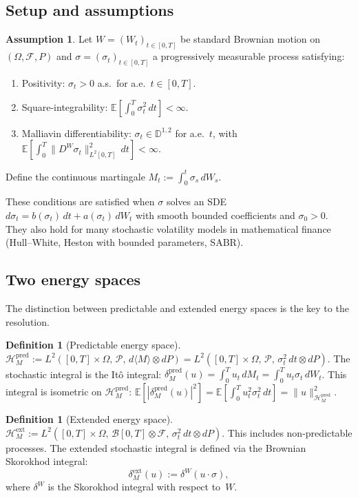 \documentclass[11pt,a4paper]{article}
\theoremstyle{plain}
\theoremstyle{definition}
\newtheorem{definition}[theorem]{Definition}
\newtheorem{assumption}[theorem]{Assumption}
\theoremstyle{remark}
\newcommand{\E}{\mathbb{E}}
\newcommand{\HM}{\mathcal{H}_M}
\begin{document}
\subsection{Setup and assumptions}

\begin{assumption}\label{ass:sv}
Let $W = (W_t)_{t \in [0,T]}$ be standard Brownian motion on $(\Omega, \mathcal{F}, P)$ and $\sigma = (\sigma_t)_{t \in [0,T]}$ a progressively measurable process satisfying:
\begin{enumerate}[label=(\roman*)]
\item \textup{Positivity:} $\sigma_t > 0$ a.s.\ for a.e.\ $t \in [0,T]$.
\item \textup{Square-integrability:} $\E[\int_0^T \sigma_t^2\,dt] < \infty$.
\item \textup{Malliavin differentiability:} $\sigma_t \in \mathbb{D}^{1,2}$ for a.e.~$t$, with $\E[\int_0^T \|D^W \sigma_t\|^2_{L^2[0,T]}\,dt] < \infty$.
\end{enumerate}
Define the continuous martingale $M_t := \int_0^t \sigma_s\,dW_s$.
\end{assumption}

These conditions are satisfied when $\sigma$ solves an SDE $d\sigma_t = b(\sigma_t)\,dt + a(\sigma_t)\,dW_t$ with smooth bounded coefficients and $\sigma_0 > 0$. They also hold for many stochastic volatility models in mathematical finance (Hull--White, Heston with bounded parameters, SABR).


\subsection{Two energy spaces}

The distinction between predictable and extended energy spaces is the key to the resolution.

\begin{definition}[Predictable energy space]\label{def:HM_pred}
$\HM^{\mathrm{pred}} := L^2([0,T] \times \Omega,\, \mathcal{P},\, d\langle M\rangle \otimes dP) = L^2([0,T] \times \Omega,\, \mathcal{P},\, \sigma_t^2\,dt \otimes dP)$. The stochastic integral is the It\^o integral: $\delta_M^{\mathrm{pred}}(u) = \int_0^T u_t\,dM_t = \int_0^T u_t \sigma_t\,dW_t$. This integral is isometric on $\HM^{\mathrm{pred}}$: $\E[|\delta_M^{\mathrm{pred}}(u)|^2] = \E[\int_0^T u_t^2 \sigma_t^2\,dt] = \|u\|^2_{\HM^{\mathrm{pred}}}$.
\end{definition}

\begin{definition}[Extended energy space]\label{def:HM_ext}
$\HM^{\mathrm{ext}} := L^2([0,T] \times \Omega,\, \mathcal{B}[0,T] \otimes \mathcal{F},\, \sigma_t^2\,dt \otimes dP)$. This includes non-predictable processes. The extended stochastic integral is defined via the Brownian Skorokhod integral:
\[
\delta_M^{\mathrm{ext}}(u) := \delta^W(u \cdot \sigma),
\]
where $\delta^W$ is the Skorokhod integral with respect to~$W$.
\end{definition}
\end{document}

